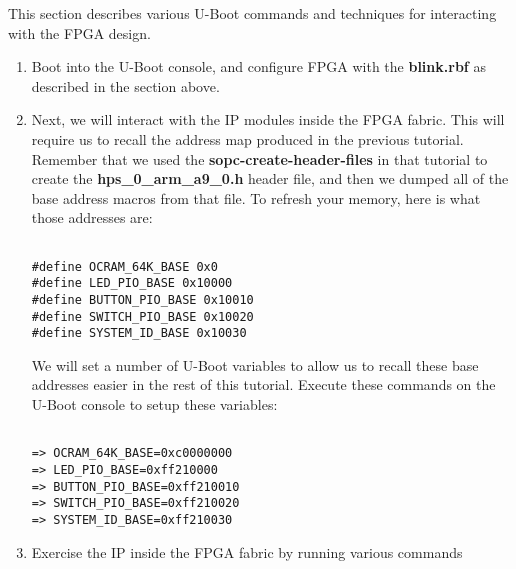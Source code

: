 \begin{flushleft}
\noindent

This section describes various U-Boot commands and techniques for interacting with the FPGA design.

\begin{enumerate}[
	label=\textbf{Step \arabic*.},
	leftmargin=*,
	widest={00},
	align=left]

\item Boot into the U-Boot console, and configure FPGA with the \textbf{blink.rbf} as described in the  section above.

\item Next, we will interact with the IP modules inside the FPGA fabric. This will require us to recall the address map produced in the previous tutorial.  Remember that we used the \textbf{sopc-create-header-files} in that tutorial to create the \textbf{hps\_0\_arm\_a9\_0.h} header file, and then we dumped all of the base address macros from that file.  To refresh your memory, here is what those addresses are:

\begin{verbatim}

#define OCRAM_64K_BASE 0x0
#define LED_PIO_BASE 0x10000
#define BUTTON_PIO_BASE 0x10010
#define SWITCH_PIO_BASE 0x10020
#define SYSTEM_ID_BASE 0x10030

\end{verbatim}

We will set a number of U-Boot variables to allow us to recall these base addresses easier in the rest of this tutorial.  Execute these commands on the U-Boot console to setup these variables:

\begin{verbatim}

=> OCRAM_64K_BASE=0xc0000000
=> LED_PIO_BASE=0xff210000
=> BUTTON_PIO_BASE=0xff210010
=> SWITCH_PIO_BASE=0xff210020
=> SYSTEM_ID_BASE=0xff210030

\end{verbatim}

\newpage

\item Exercise the IP inside the FPGA fabric by running various commands

\begin{enumerate}[
	label=\textbf{Step \arabic{enumi}\alph*.},
	leftmargin=*,
	align=left]


\end{enumerate}
\end{enumerate}
\end{flushleft}
